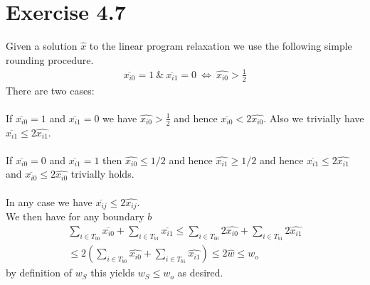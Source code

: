 \section*{Exercise 4.7}
Given a solution $\hat{x}$ to the linear program relaxation we use the following simple rounding procedure. 
\begin{align*}
	\overline{x_{i0}}=1 \ \& \ \overline{x_{i1}}=0 \ \iff \ \widehat{x_{i0}}>\frac{1}{2}
\end{align*}
There are two cases: \\ \\
If $\overline{x_{i0}}=1$ and $\overline{x_{i1}}=0$ we have 
$\widehat{x_{i0}}>\frac{1}{2}$ and hence $\overline{x_{i0}} < 2 \widehat{x_{i0}}$. 
Also we trivially have $\overline{x_{i1}} \leq 2 \widehat{x_{i1}}$. \\ \\
If $\overline{x_{i0}}=0$ and $\overline{x_{i1}}=1$ 
then $\widehat{x_{i0}} \leq 1/2$ and hence $\widehat{x_{i1}} \geq 1/2$ and hence
$\overline{x_{i1}} \leq 2 \widehat{x_{i1}}$ and
$\overline{x_{i0}} \leq 2 \widehat{x_{i0}}$ trivially holds. \\ \\
In any case we have $\overline{x_{ij}} \leq 2 \widehat{x_{ij}}$. \\
We then have for any boundary $b$
\begin{align*}
	\sum_{i \in T_{b0}}\overline{x_{i0}}+ \sum_{i \in T_{b1}}\overline{x_{i1}} \leq
	\sum_{i \in T_{b0}}2\widehat{x_{i0}}+ \sum_{i \in T_{b1}}2\widehat{x_{i1}} \\
	\leq 2 \left( \sum_{i \in T_{b0}}\widehat{x_{i0}}+ \sum_{i \in T_{b1}}\widehat{x_{i1}} \right) \leq
	2 \widehat{w} \leq w_{o}
\end{align*}
by definition of $w_S$ this yields $w_S \leq w_o$ as desired.

